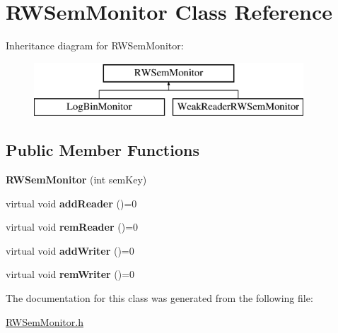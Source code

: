 \hypertarget{classRWSemMonitor}{\section{R\-W\-Sem\-Monitor Class Reference}
\label{classRWSemMonitor}
}
Inheritance diagram for R\-W\-Sem\-Monitor\-:\begin{figure}[H]
\begin{center}
\leavevmode
\includegraphics[height=2.000000cm]{classRWSemMonitor}
\end{center}
\end{figure}
\subsection*{Public Member Functions}
\begin{DoxyCompactItemize}
\item 
\hypertarget{classRWSemMonitor_a690404a73116a413cdb847d657029ef0}{{\bfseries R\-W\-Sem\-Monitor} (int sem\-Key)}\label{classRWSemMonitor_a690404a73116a413cdb847d657029ef0}

\item 
\hypertarget{classRWSemMonitor_acfcb75dd157a0f4a60cab41f379d0a2e}{virtual void {\bfseries add\-Reader} ()=0}\label{classRWSemMonitor_acfcb75dd157a0f4a60cab41f379d0a2e}

\item 
\hypertarget{classRWSemMonitor_a14499381a9fc15b8eecf2428d0463745}{virtual void {\bfseries rem\-Reader} ()=0}\label{classRWSemMonitor_a14499381a9fc15b8eecf2428d0463745}

\item 
\hypertarget{classRWSemMonitor_af872d3ee64213c64a5894fcc1a27911e}{virtual void {\bfseries add\-Writer} ()=0}\label{classRWSemMonitor_af872d3ee64213c64a5894fcc1a27911e}

\item 
\hypertarget{classRWSemMonitor_a60dd66aacb8d0d0fac4e2c378a884b6e}{virtual void {\bfseries rem\-Writer} ()=0}\label{classRWSemMonitor_a60dd66aacb8d0d0fac4e2c378a884b6e}

\end{DoxyCompactItemize}


The documentation for this class was generated from the following file\-:\begin{DoxyCompactItemize}
\item 
\hyperlink{RWSemMonitor_8h}{R\-W\-Sem\-Monitor.\-h}\end{DoxyCompactItemize}
